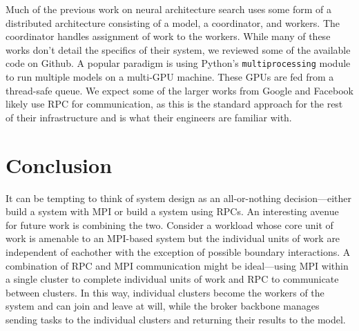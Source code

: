 \documentclass[conference]{IEEEtran}
\begin{document}
Much of the previous work on neural architecture search uses some form of a
distributed architecture consisting of a model, a coordinator, and workers. The
coordinator handles assignment of work to the workers. While many of these works
don't detail the specifics of their system, we reviewed some of the available
code on Github. A popular paradigm is using Python's \texttt{multiprocessing}
module to run multiple models on a multi-GPU machine. These GPUs are fed from a
thread-safe queue. We expect some of the larger works from Google and Facebook
likely use RPC for communication, as this is the standard approach for the rest
of their infrastructure and is what their engineers are familiar with.

\section{Conclusion}
It can be tempting to think of system design as an all-or-nothing
decision---either build a system with MPI or build a system using RPCs. An
interesting avenue for future work is combining the two. Consider a workload
whose core unit of work is amenable to an MPI-based system but the individual
units of work are independent of eachother with the exception of possible
boundary interactions. A combination of RPC and MPI communication might be
ideal---using MPI within a single cluster to complete individual units of work
and RPC to communicate between clusters. In this way, individual clusters become
the workers of the system and can join and leave at will, while the broker
backbone manages sending tasks to the individual clusters and returning their
results to the model.
\balance


\end{document}
